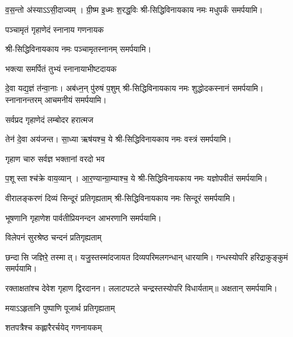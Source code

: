 \begin{center}
{व॒स॒न्तो अ॑स्याऽऽसी॒दाज्यम्। ग्री॒ष्म इ॒ध्मः श॒रद्ध॒विः}
श्री-सिद्धिविनायकाय नमः मधुपर्कं समर्पयामि।\medskip

{पञ्चामृतं गृहाणेदं स्नानाय गणनायक}

श्री-सिद्धिविनायकाय नमः पञ्चामृतस्नानम् समर्पयामि।\medskip

{भक्त्या समर्पितं तुभ्यं स्नानायाभीष्टदायक}

{दे॒वा यद्य॒ज्ञं त॑न्वा॒नाः। अब॑ध्न॒न् पु॑रुषं प॒शुम्}
श्री-सिद्धिविनायकाय नमः शुद्धोदकस्नानं समर्पयामि। स्नानानन्तरम् आचमनीयं समर्पयामि।\medskip

{सर्वप्रद गृहाणेदं लम्बोदर हरात्मज}

{तेन॑ दे॒वा अय॑जन्त। सा॒ध्या ऋष॑यश्च॒ ये}
श्री-सिद्धिविनायकाय नमः वस्त्रं समर्पयामि।\medskip

{गृहाण चारु सर्वज्ञ भक्तानां वरदो भव}

{प॒शूस्ताश्च॑क्रे वाय॒व्यान्। आ॒र॒ण्यान्ग्रा॒म्याश्च॒ ये}
श्री-सिद्धिविनायकाय नमः यज्ञोपवीतं समर्पयामि।\medskip

{वीरालङ्करणं दिव्यं सिन्दूरं प्रतिगृह्यताम्}
श्री-सिद्धिविनायकाय नमः सिन्दूरं समर्पयामि।\medskip

{भूषणानि गृहाणेश पार्वतीप्रियनन्दन}
आभरणानि समर्पयामि।\medskip

{विलेपनं सुरश्रेष्ठ चन्दनं प्रतिगृह्यताम्}

{छन्दासि जज्ञिरे॒ तस्मात्। यजु॒स्तस्मा॑दजायत}
दिव्यपरिमलगन्धान् धारयामि। गन्धस्योपरि हरिद्राकुङ्कुमं समर्पयामि।\medskip

रक्ताक्षतांश्च देवेश गृहाण द्विरदानन।
ललाटपटले चन्द्रस्तस्योपरि विधार्यताम्॥
अक्षतान् समर्पयामि।\medskip

{मयाऽऽहृतानि पुष्पाणि पूजार्थ प्रतिगृह्यताम्}

{शतपत्रैश्च कह्लारैरर्चयेद् गणनायकम्}


\end{center}
